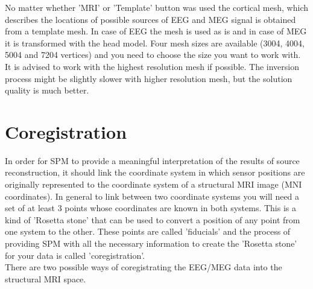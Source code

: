 No matter whether 'MRI' or 'Template' button was used the cortical mesh, which describes the locations of
possible sources of EEG and MEG signal is obtained from a template mesh.
In case of EEG the mesh is used as is and in case of MEG it is transformed with the head model. 
Four mesh sizes are available (3004, 4004, 5004 and 7204 vertices) and you need to choose the size
you want to work with. It is advised to work with the highest resolution mesh if possible. The inversion
process might be slightly slower with higher resolution mesh, but the solution quality is much better.

\section{Coregistration}

In order for SPM to provide a meaningful
interpretation of the results of source reconstruction, it should link the coordinate
system in which sensor positions are originally represented to the coordinate system of
a structural MRI image (MNI coordinates). In general to link between two coordinate
systems you will need a set of at least 3 points whose coordinates are known in both systems.
This is a kind of 'Rosetta stone'  that can be used to convert a position of any point from one system
to the other. These points are called 'fiducials' and the process of providing SPM with all the necessary
information to create the 'Rosetta stone' for your data is called 'coregistration'.  \\

There are two possible ways of coregistrating the EEG/MEG data into the structural MRI space. 

